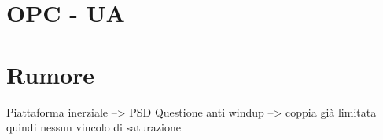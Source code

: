 \chapter{OPC - UA}
\chapter{Rumore}
Piattaforma inerziale --> PSD
Questione anti windup --> coppia già limitata quindi nessun vincolo di saturazione